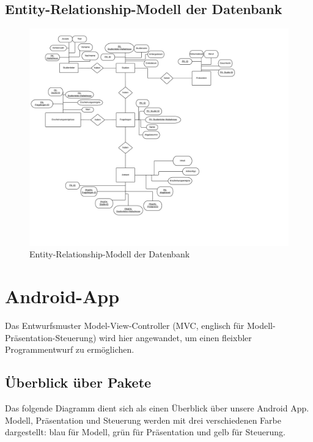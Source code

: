 \documentclass[a4paper]{scrreprt}
\begin{document}
        \newpage
        \section{Entity-Relationship-Modell der Datenbank}
            \begin{figure}[ht]
                \centering
                \includegraphics[scale = 0.13]{PSE_Datenbank_ERM.jpeg}
                \caption{Entity-Relationship-Modell der Datenbank}
            \end{figure}


    \newpage
    \chapter{Android-App}

        Das Entwurfsmuster Model-View-Controller (MVC, englisch für Modell-Präsentation-Steuerung) wird hier angewandet, um einen fleixbler Programmentwurf zu ermöglichen.


        \vspace*{1cm}
        \section{Überblick über Pakete}

            Das folgende Diagramm dient sich als einen Überblick über unsere Android App. Modell, Präsentation und Steuerung werden mit drei verschiedenen Farbe dargestellt: blau für Modell, grün für Präsentation und gelb für Steuerung.
\end{document}
